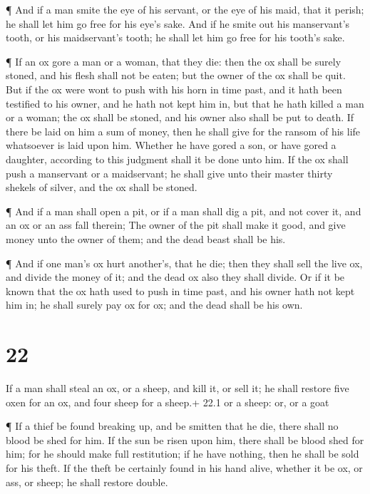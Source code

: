  ¶ And if a man smite the eye of his servant, or the eye of
his maid, that it perish; he shall let him go free for his eye's sake.
 And if he smite out his manservant's tooth, or his
maidservant's tooth; he shall let him go free for his tooth's sake.

 ¶ If an ox gore a man or a woman, that they die: then the
ox shall be surely stoned, and his flesh shall not be eaten; but the
owner of the ox shall be quit.  But if the ox were wont to
push with his horn in time past, and it hath been testified to his
owner, and he hath not kept him in, but that he hath killed a man or a
woman; the ox shall be stoned, and his owner also shall be put to death.
 If there be laid on him a sum of money, then he shall give
for the ransom of his life whatsoever is laid upon him. 
Whether he have gored a son, or have gored a daughter, according to this
judgment shall it be done unto him.  If the ox shall push a
manservant or a maidservant; he shall give unto their master thirty
shekels of silver, and the ox shall be stoned.

 ¶ And if a man shall open a pit, or if a man shall dig a
pit, and not cover it, and an ox or an ass fall therein; 
The owner of the pit shall make it good, and give money unto the owner
of them; and the dead beast shall be his.

 ¶ And if one man's ox hurt another's, that he die; then
they shall sell the live ox, and divide the money of it; and the dead ox
also they shall divide.  Or if it be known that the ox hath
used to push in time past, and his owner hath not kept him in; he shall
surely pay ox for ox; and the dead shall be his own.

\hypertarget{section-21}{%
\section{22}\label{section-21}}

 If a man shall steal an ox, or a sheep, and kill it, or
sell it; he shall restore five oxen for an ox, and four sheep for a
sheep.+ 22.1 or a sheep: or, or a goat

 ¶ If a thief be found breaking up, and be smitten that he
die, there shall no blood be shed for him.  If the sun be
risen upon him, there shall be blood shed for him; for he should make
full restitution; if he have nothing, then he shall be sold for his
theft.  If the theft be certainly found in his hand alive,
whether it be ox, or ass, or sheep; he shall restore double.

